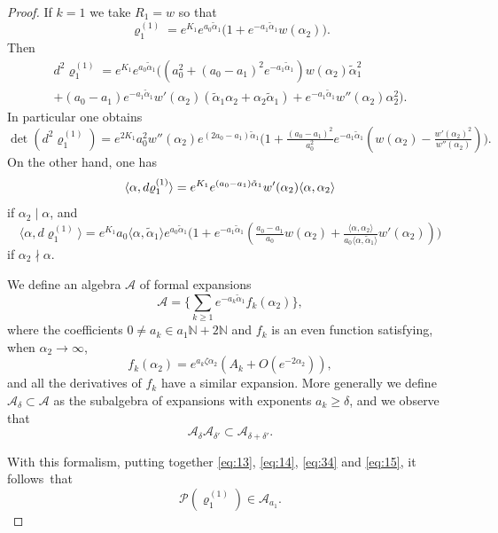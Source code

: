 \documentclass[JEP,XML,SOM,Unicode, NoEqCountersInSection, NoFloatCountersInSection]{cedram}
\theoremstyle{plain}
\theoremstyle{definition}
\newcommand{\cA}{\mathcal{A}}
\newcommand{\ta}{\tilde \alpha}
\newcommand{\opP}{\mathcal{P}}
\newcommand{\rhoun}{\varrho^{(1)}}
\begin{document}
\begin{proof}
If $k=1$ we take $R_1=w$ so that
\[ \rhoun_1 = e^{K_1}e^{a_0 \ta_1} \big( 1 + e^{-a_1\ta_1}w(\alpha_2) \big). \]
Then
\begin{multline*}
d^2\rhoun_1 = e^{K_1}e^{a_0 \ta_1} \big( (a_0^2+(a_0-a_1)^2e^{-a_1\ta_1})w(\alpha_2) \ta_1^2 \\  + (a_0-a_1) e^{-a_1\ta_1}w'(\alpha_2) (\ta_1\alpha_2+\alpha_2\ta_1) +e^{-a_1\ta_1}w''(\alpha_2) \alpha_2^2 \big).
\end{multline*}
In particular one obtains
\begin{equation}
\label{eq:13}
\det(d^2\rhoun_1) = e^{2K_1}a_0^2w''(\alpha_2)e^{(2a_0-a_1)\ta_1} \big(1 + \tfrac{(a_0-a_1)^2}{a_0^2}e^{-a_1\ta_1} ( w(\alpha_2)-\tfrac{w'(\alpha_2)^2}{w''(\alpha_2)}) \big).
\end{equation}
On the other hand, one has
\begin{equation}
\label{eq:14}
\langle\alpha,d\rhoun_1\rangle = e^{K_1}e^{(a_0-a_1)\ta_1} w'(\alpha_2) \langle\alpha,\alpha_2\rangle \\
\end{equation}
if $\alpha_2 \mid \alpha$, and
\begin{equation}\label{eq:34}
\langle\alpha,d\rhoun_1\rangle = e^{K_1}a_0\langle\alpha,\ta_1\rangle e^{a_0\ta_1} \big( 1 + e^{-a_1\ta_1} (\tfrac{a_0-a_1}{a_0}w(\alpha_2) + \tfrac{\langle\alpha,\alpha_2\rangle}{a_0\langle\alpha,\ta_1\rangle} w'(\alpha_2)) \big)
\end{equation}
if $\alpha_2 \nmid \alpha$.

We define an algebra $\cA$ of formal expansions
\[ \cA = \biggl\{ \sum_{k\geq 1} e^{-a_k\ta_1}f_k(\alpha_2) \biggr\}, \]
where the coefficients $0\neq a_k\in a_1\mathbb{N}+2\mathbb{N}$ and $f_k$ is an even function satisfying, when $\alpha_2\to\infty$,
\[ f_k(\alpha_2) = e^{a_k\zeta\alpha_2} (A_k + O(e^{-2\alpha_2})), \]
and all the derivatives of $f_k$ have a similar expansion. More generally we define $\cA_\delta\subset \cA$ as the subalgebra of expansions with exponents $a_k\geq\delta$, and we observe that
\[ \cA_\delta \cA_{\delta'} \subset \cA_{\delta+\delta'}. \]

With this formalism, putting together \eqref{eq:13}, \eqref{eq:14}, \eqref{eq:34} and \eqref{eq:15}, it follows~that
\begin{equation}
\label{eq:16}
\opP(\rhoun_1) \in \cA_{a_1}.
\end{equation}


\end{proof}
\end{document}
